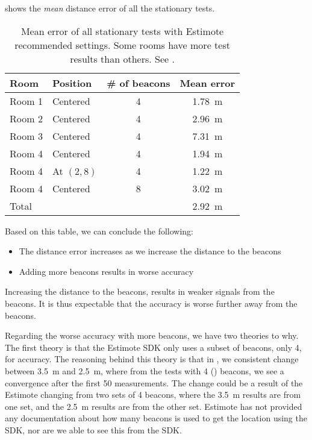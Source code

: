  shows the \emph{mean} distance error of all the stationary tests. 

\begin{table}[!htb]
  \centering
  \begin{tabular}{l|l c c}
    Room   & Position   & \# of beacons & Mean error \\ \hline
    Room 1 & Centered   & 4             & \SI{1.78}{\meter} \\
    Room 2 & Centered   & 4             & \SI{2.96}{\meter} \\
    Room 3 & Centered   & 4             & \SI{7.31}{\meter} \\
    Room 4 & Centered   & 4             & \SI{1.94}{\meter} \\
    Room 4 & At $(2,8)$ & 4             & \SI{1.22}{\meter} \\
    Room 4 & Centered   & 8             & \SI{3.02}{\meter} \\ \hline
    Total  &            &               & \SI{2.92}{\meter}
  \end{tabular}
  \caption{Mean error of all stationary tests with Estimote recommended settings. Some rooms have more test results than others. See .}
  \label{table:meanerrorresults}
\end{table}

Based on this table, we can conclude the following:
\begin{itemize}
  \item The distance error increases as we increase the distance to the beacons
  \item Adding more beacons results in worse accuracy
\end{itemize}

Increasing the distance to the beacons, results in weaker signals from the beacons. 
It is thus expectable that the accuracy is worse further away from the beacons. 

Regarding the worse accuracy with more beacons, 
we have two theories to why.
The first theory is that the Estimote SDK only uses a subset of beacons, \eg only \num{4}, for accuracy. 
The reasoning behind this theory is that in , 
we consistent change between \SI{3.5}{\meter} and \SI{2.5}{\meter}, 
where from the tests with \num{4} () beacons, 
we see a convergence after the first \num{50} measurements.
The change could be a result of the Estimote changing from two sets of \num{4} beacons, 
where the \SI{3.5}{\meter} results are from one set, 
and the \SI{2.5}{\meter} results are from the other set. 
Estimote has not provided any documentation about how many beacons is used to get the location using the SDK, 
nor are we able to see this from the SDK. 

